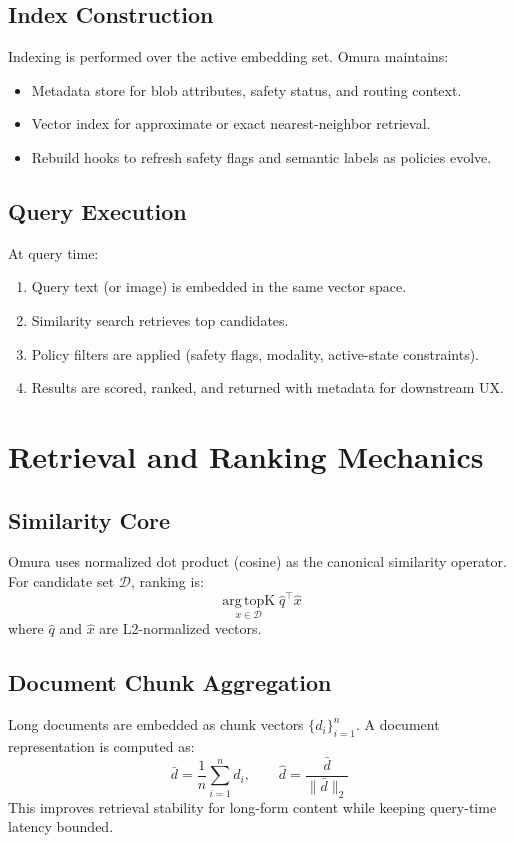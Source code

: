 \documentclass[11pt]{article}
\begin{document}
\subsection{Index Construction}
Indexing is performed over the active embedding set. Omura maintains:
\begin{itemize}[leftmargin=1.2em]
  \item Metadata store for blob attributes, safety status, and routing context.
  \item Vector index for approximate or exact nearest-neighbor retrieval.
  \item Rebuild hooks to refresh safety flags and semantic labels as policies evolve.
\end{itemize}

\subsection{Query Execution}
At query time:
\begin{enumerate}[leftmargin=1.2em]
  \item Query text (or image) is embedded in the same vector space.
  \item Similarity search retrieves top candidates.
  \item Policy filters are applied (safety flags, modality, active-state constraints).
  \item Results are scored, ranked, and returned with metadata for downstream UX.
\end{enumerate}

\section{Retrieval and Ranking Mechanics}
\subsection{Similarity Core}
Omura uses normalized dot product (cosine) as the canonical similarity operator.
For candidate set \(\mathcal{D}\), ranking is:
\[
\operatorname*{arg\,topK}_{x \in \mathcal{D}} \hat{q}^{\top}\hat{x}
\]
where \(\hat{q}\) and \(\hat{x}\) are L2-normalized vectors.

\subsection{Document Chunk Aggregation}
Long documents are embedded as chunk vectors \(\{d_i\}_{i=1}^{n}\). A document
representation is computed as:
\[
\bar{d} = \frac{1}{n}\sum_{i=1}^{n} d_i,\qquad \hat{d}=\frac{\bar{d}}{\|\bar{d}\|_2}
\]
This improves retrieval stability for long-form content while keeping query-time
latency bounded.
\end{document}
